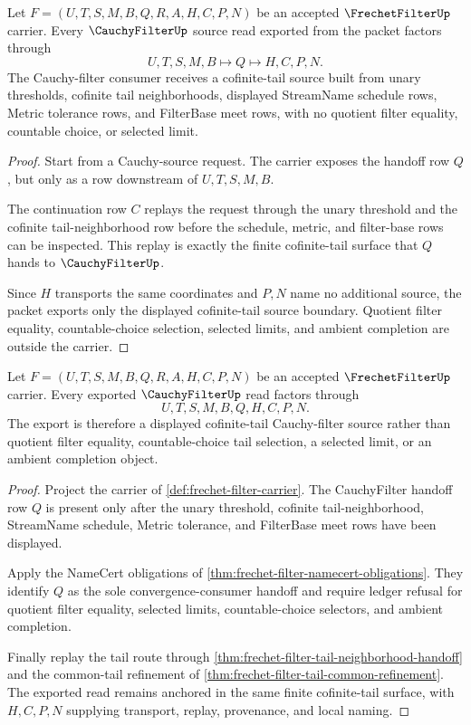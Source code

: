 \begin{theorem}
\label{thm:frechet-filter-cauchy-source-boundary}
Let $F=(U,T,S,M,B,Q,R,A,H,C,P,N)$ be an accepted $\FrechetFilterUp$ carrier. Every $\CauchyFilterUp$ source read exported from the packet factors through
$$
U,T,S,M,B \longmapsto Q \longmapsto H,C,P,N .
$$
The Cauchy-filter consumer receives a cofinite-tail source built from unary thresholds, cofinite tail neighborhoods, displayed StreamName schedule rows, Metric tolerance rows, and FilterBase meet rows, with no quotient filter equality, countable choice, or selected limit.
\end{theorem}
\begin{proof}
Start from a Cauchy-source request. The carrier exposes the handoff row $Q$, but only as a row downstream of $U,T,S,M,B$.

The continuation row $C$ replays the request through the unary threshold and the cofinite tail-neighborhood row before the schedule, metric, and filter-base rows can be inspected. This replay is exactly the finite cofinite-tail surface that $Q$ hands to $\CauchyFilterUp$.

Since $H$ transports the same coordinates and $P,N$ name no additional source, the packet exports only the displayed cofinite-tail source boundary. Quotient filter equality, countable-choice selection, selected limits, and ambient completion are outside the carrier.
\end{proof}

\begin{theorem}
\label{thm:frechet-filter-cauchy-filter-export}
Let $F=(U,T,S,M,B,Q,R,A,H,C,P,N)$ be an accepted $\FrechetFilterUp$ carrier. Every exported $\CauchyFilterUp$ read factors through
$$
U,T,S,M,B,Q,H,C,P,N .
$$
The export is therefore a displayed cofinite-tail Cauchy-filter source rather than quotient filter equality, countable-choice tail selection, a selected limit, or an ambient completion object.
\end{theorem}
\begin{proof}
Project the carrier of \autoref{def:frechet-filter-carrier}. The CauchyFilter handoff row $Q$ is present only after the unary threshold, cofinite tail-neighborhood, StreamName schedule, Metric tolerance, and FilterBase meet rows have been displayed.

Apply the NameCert obligations of \autoref{thm:frechet-filter-namecert-obligations}. They identify $Q$ as the sole convergence-consumer handoff and require ledger refusal for quotient filter equality, selected limits, countable-choice selectors, and ambient completion.

Finally replay the tail route through \autoref{thm:frechet-filter-tail-neighborhood-handoff} and the common-tail refinement of \autoref{thm:frechet-filter-tail-common-refinement}. The exported read remains anchored in the same finite cofinite-tail surface, with $H,C,P,N$ supplying transport, replay, provenance, and local naming.
\end{proof}

